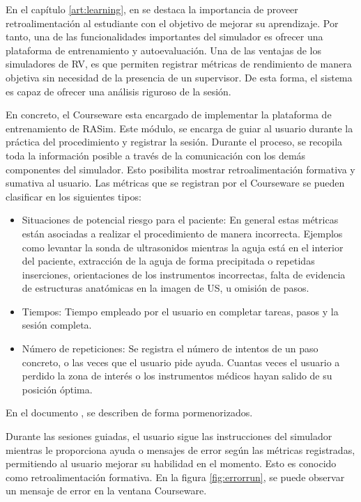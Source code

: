 En el capítulo \ref{art:learning}, en \cite{ericsson1993role} se destaca la importancia de proveer retroalimentación al estudiante con el objetivo de mejorar su aprendizaje. Por tanto, una de las funcionalidades importantes del simulador es ofrecer una plataforma de entrenamiento y autoevaluación. Una de las ventajas de los simuladores de \ac{RV}, es que permiten registrar métricas de rendimiento de manera objetiva sin necesidad de la presencia de un supervisor. De esta forma, el sistema es capaz de ofrecer una análisis riguroso de la sesión.

En concreto, el  \ac{Courseware} esta encargado de implementar la plataforma de entrenamiento de \ac{RASim}. Este módulo, se encarga de guiar al usuario durante la práctica del procedimiento y registrar la sesión. Durante el proceso, se recopila toda la información posible a través de la comunicación con los demás componentes del simulador. Esto posibilita mostrar retroalimentación formativa y sumativa al usuario. Las métricas que se registran por el \ac{Courseware} se pueden clasificar en los siguientes tipos:

\begin{itemize}
    \item Situaciones de potencial riesgo para el paciente: En general estas métricas están asociadas a realizar el procedimiento de manera incorrecta. Ejemplos como levantar la sonda de ultrasonidos mientras la aguja está en el interior del paciente, extracción de la aguja de forma precipitada o repetidas inserciones, orientaciones de los instrumentos incorrectas, falta de evidencia de estructuras anatómicas en la imagen de \ac{US}, u omisión de pasos. 
    
    \item Tiempos: Tiempo empleado por el usuario en completar tareas, pasos y la sesión completa. 
    
    \item Número de repeticiones: Se registra el número de intentos de un paso concreto, o las veces que el usuario pide ayuda. Cuantas veces el usuario a perdido la zona de interés o los instrumentos médicos hayan salido de su posición óptima.
\end{itemize}

En el documento \cite{ded4.4}, se describen de forma pormenorizados.

Durante las sesiones guiadas, el usuario sigue las instrucciones del simulador mientras le proporciona ayuda o mensajes de error según las métricas registradas, permitiendo al usuario mejorar su habilidad en el momento. Esto es conocido como retroalimentación formativa. En la figura \ref{fig:errorrun}, se puede observar un mensaje de error en la ventana \ac{Courseware}.


